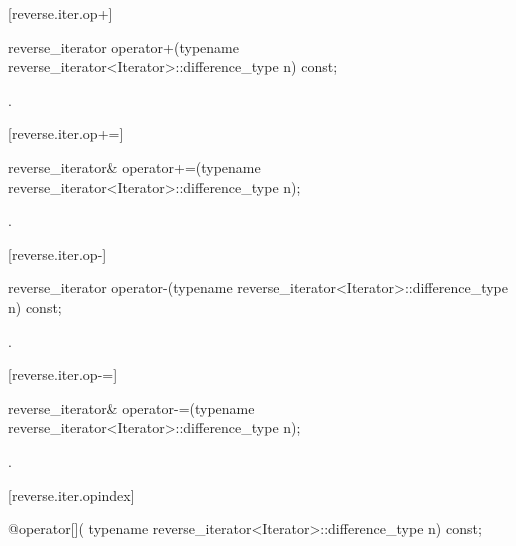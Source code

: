 [reverse.iter.op+]{}

%
\begin{itemdecl}
reverse_iterator
operator+(typename reverse_iterator<Iterator>::difference_type n) const;
\end{itemdecl}

\begin{itemdescr}
\pnum
\returns
{}.
\end{itemdescr}

[reverse.iter.op+=]{}

%
\begin{itemdecl}
reverse_iterator&
operator+=(typename reverse_iterator<Iterator>::difference_type n);
\end{itemdecl}

\begin{itemdescr}
\pnum
\effects
{}

\pnum
\returns
{}.
\end{itemdescr}

[reverse.iter.op-]{}

%
\begin{itemdecl}
reverse_iterator
operator-(typename reverse_iterator<Iterator>::difference_type n) const;
\end{itemdecl}

\begin{itemdescr}
\pnum
\returns
{}.
\end{itemdescr}

[reverse.iter.op-=]{}

%
\begin{itemdecl}
reverse_iterator&
operator-=(typename reverse_iterator<Iterator>::difference_type n);
\end{itemdecl}

\begin{itemdescr}
\pnum
\effects
{}

\pnum
\returns
{}.
\end{itemdescr}

[reverse.iter.opindex]{}

%
\begin{itemdecl}
@\unspec@ operator[](
    typename reverse_iterator<Iterator>::difference_type n) const;
\end{itemdecl}

